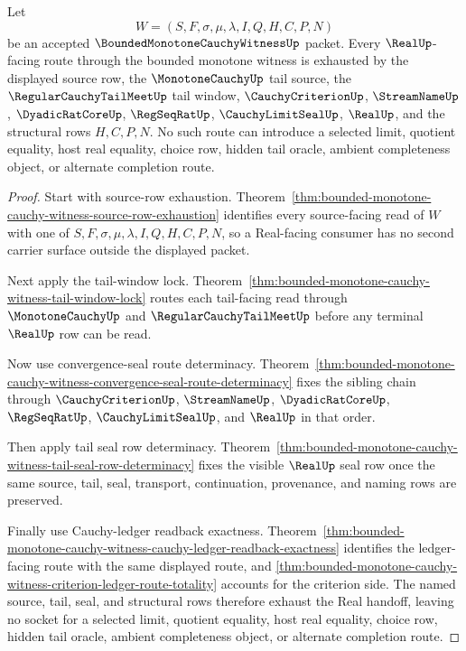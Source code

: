 \begin{theorem}
\label{thm:bounded-monotone-cauchy-witness-selector-free-real-route}
Let
$$
W=(S,F,\sigma,\mu,\lambda,I,Q,H,C,P,N)
$$
be an accepted $\BoundedMonotoneCauchyWitnessUp$ packet. Every $\RealUp$-facing route through the bounded monotone witness is exhausted by the displayed source row, the $\MonotoneCauchyUp$ tail source, the $\RegularCauchyTailMeetUp$ tail window, $\CauchyCriterionUp$, $\StreamNameUp$, $\DyadicRatCoreUp$, $\RegSeqRatUp$, $\CauchyLimitSealUp$, $\RealUp$, and the structural rows $H,C,P,N$. No such route can introduce a selected limit, quotient equality, host real equality, choice row, hidden tail oracle, ambient completeness object, or alternate completion route.
\end{theorem}
\begin{proof}
Start with source-row exhaustion. Theorem~\ref{thm:bounded-monotone-cauchy-witness-source-row-exhaustion} identifies every source-facing read of $W$ with one of $S,F,\sigma,\mu,\lambda,I,Q,H,C,P,N$, so a Real-facing consumer has no second carrier surface outside the displayed packet.

Next apply the tail-window lock. Theorem~\ref{thm:bounded-monotone-cauchy-witness-tail-window-lock} routes each tail-facing read through $\MonotoneCauchyUp$ and $\RegularCauchyTailMeetUp$ before any terminal $\RealUp$ row can be read.

Now use convergence-seal route determinacy. Theorem~\ref{thm:bounded-monotone-cauchy-witness-convergence-seal-route-determinacy} fixes the sibling chain through $\CauchyCriterionUp$, $\StreamNameUp$, $\DyadicRatCoreUp$, $\RegSeqRatUp$, $\CauchyLimitSealUp$, and $\RealUp$ in that order.

Then apply tail seal row determinacy. Theorem~\ref{thm:bounded-monotone-cauchy-witness-tail-seal-row-determinacy} fixes the visible $\RealUp$ seal row once the same source, tail, seal, transport, continuation, provenance, and naming rows are preserved.

Finally use Cauchy-ledger readback exactness. Theorem~\ref{thm:bounded-monotone-cauchy-witness-cauchy-ledger-readback-exactness} identifies the ledger-facing route with the same displayed route, and \autoref{thm:bounded-monotone-cauchy-witness-criterion-ledger-route-totality} accounts for the criterion side. The named source, tail, seal, and structural rows therefore exhaust the Real handoff, leaving no socket for a selected limit, quotient equality, host real equality, choice row, hidden tail oracle, ambient completeness object, or alternate completion route.
\end{proof}

